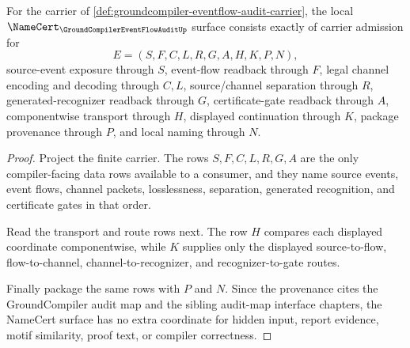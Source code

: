\begin{theorem}
\label{thm:groundcompiler-eventflow-audit-namecert-obligations}
For the carrier of \autoref{def:groundcompiler-eventflow-audit-carrier}, the local $\NameCert_{\GroundCompilerEventFlowAuditUp}$ surface consists exactly of carrier admission for
$$
E=(S,F,C,L,R,G,A,H,K,P,N),
$$
source-event exposure through $S$, event-flow readback through $F$, legal channel encoding and decoding through $C,L$, source/channel separation through $R$, generated-recognizer readback through $G$, certificate-gate readback through $A$, componentwise transport through $H$, displayed continuation through $K$, package provenance through $P$, and local naming through $N$.
\end{theorem}
\begin{proof}
Project the finite carrier. The rows $S,F,C,L,R,G,A$ are the only compiler-facing data rows available to a consumer, and they name source events, event flows, channel packets, losslessness, separation, generated recognition, and certificate gates in that order.

Read the transport and route rows next. The row $H$ compares each displayed coordinate componentwise, while $K$ supplies only the displayed source-to-flow, flow-to-channel, channel-to-recognizer, and recognizer-to-gate routes.

Finally package the same rows with $P$ and $N$. Since the provenance cites the GroundCompiler audit map and the sibling audit-map interface chapters, the NameCert surface has no extra coordinate for hidden input, report evidence, motif similarity, proof text, or compiler correctness.
\end{proof}

